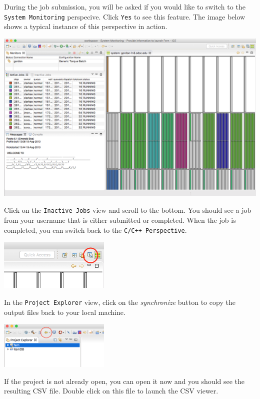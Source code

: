 During the job submission, you will be asked if you would like to switch to the
\texttt{System Monitoring} perspecive. Click \texttt{Yes} to see this feature.
The image below shows a typical instance of this perspective in action.

\begin{center} \includegraphics[width=\textwidth]{figures/sysMon}
\end{center}

Click on the \texttt{Inactive Jobs} view and scroll to the bottom. You should
see a job from your username that is either submitted or completed. When the job
is completed, you can switch back to the \texttt{C/C++ Perspective}.

\begin{center} \includegraphics[width=200]{figures/cppPersp}
\end{center}

In the \texttt{Project Explorer} view, click on the \textit{synchronize}
button to copy the output files back to your local machine. 

\begin{center} \includegraphics[width=200]{figures/syncButton}
\end{center}

If the project is not already open, you can open it now and
you should see the resulting CSV file. Double click on this file to launch the CSV viewer.


